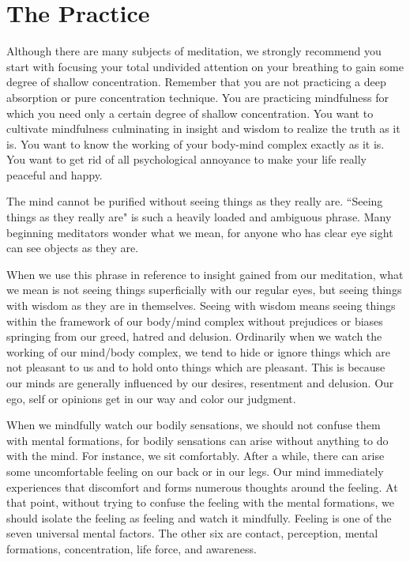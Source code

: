 \chapter{The Practice}
Although there are many subjects of meditation, we
strongly recommend you start with focusing your total undivided attention on
your breathing to gain some degree of shallow concentration. Remember that you
are not practicing a deep absorption or pure concentration technique. You are
practicing mindfulness for which you need only a certain degree of shallow
concentration. You want to cultivate mindfulness culminating in insight and
wisdom to realize the truth as it is. You want to know the working of your
body-mind complex exactly as it is. You want to get rid of all psychological
annoyance to make your life really peaceful and happy.

The mind cannot be purified without seeing things as they really are. ``Seeing
things as they really are" is such a heavily loaded and ambiguous phrase. Many
beginning meditators wonder what we mean, for anyone who has clear eye sight can
see objects as they are.

When we use this phrase in reference to insight gained from our meditation, what
we mean is not seeing things superficially with our regular eyes, but seeing
things with wisdom as they are in themselves. Seeing with wisdom means seeing
things within the framework of our body/mind complex without prejudices or
biases springing from our greed, hatred and delusion. Ordinarily when we watch
the working of our mind/body complex, we tend to hide or ignore things which are
not pleasant to us and to hold onto things which are pleasant. This is because
our minds are generally influenced by our desires, resentment and delusion. Our
ego, self or opinions get in our way and color our judgment.

When we mindfully watch our bodily sensations, we should not confuse them with
mental formations, for bodily sensations can arise without anything to do with
the mind. For instance, we sit comfortably. After a while, there can arise some
uncomfortable feeling on our back or in our legs. Our mind immediately
experiences that discomfort and forms numerous thoughts around the feeling. At
that point, without trying to confuse the feeling with the mental formations, we
should isolate the feeling as feeling and watch it mindfully. Feeling is one of
the seven universal mental factors. The other six are contact, perception,
mental formations, concentration, life force, and awareness.

